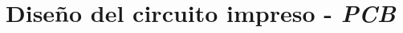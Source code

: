 \documentclass[10pt,a4paper]{article}
\begin{document}
%			
%		
%			
%		
%			
%	
%			
%	
%			
%	
%			
%		
%			
%	
%			
%			
%			

	\part{Diseño del circuito impreso - \emph{PCB}}\label{part:pcb}
\end{document}
